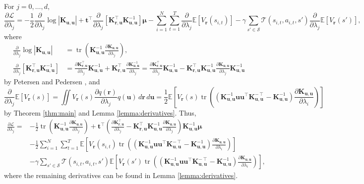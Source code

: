 \documentclass{article}
\theoremstyle{definition}
\theoremstyle{remark}
\DeclareMathOperator{\tr}{tr}
\newcommand{\Kuu}{\mathbf{K}_{\mathbf{u},\mathbf{u}}}
\newcommand{\Kru}{\mathbf{K}_{\mathbf{r},\mathbf{u}}}
\newcommand{\V}{V_{\mathbf{r}}}
\newcommand{\dlj}{\frac{\partial}{\partial \lambda_j}}
\newcommand{\dx}{\,d\mathbf{r}\,d\mathbf{u}}
\begin{document}
For $j = 0, \dots, d$,
\[
  \frac{\partial \mathcal{L}}{\partial \lambda_j} = - \frac{1}{2}\dlj\log|\Kuu|
  + \mathbf{t}^\intercal\dlj \left[ \Kru^\intercal\Kuu^{-1} \right] \bm\mu -
  \sum_{i=1}^N \sum_{t=1}^T \dlj\mathbb{E}[\V(s_{i,t})] -
  \gamma\sum_{s' \in \mathcal{S}} \mathcal{T}(s_{i,t}, a_{i,t},
  s')\dlj\mathbb{E}[\V(s')],
\]
where
\begin{align*}
  \dlj\log|\Kuu| &= \tr \left( \Kuu^{-1} \frac{\partial \Kuu}{\partial \lambda_j}
  \right), \\
  \dlj \left[ \Kru^\intercal\Kuu^{-1} \right] &= \frac{\partial
    \Kru^\intercal}{\partial \lambda_j} \Kuu^{-1} + \Kru^\intercal
  \frac{\partial \Kuu^{-1}}{\partial \lambda_j} = \frac{\partial
    \Kru^\intercal}{\partial \lambda_j} \Kuu^{-1} -
  \Kru^\intercal\Kuu^{-1}\frac{\partial \Kuu}{\partial \lambda_j}\Kuu^{-1}
\end{align*}
by Petersen and Pedersen \cite{petersen2008matrix}, and
\[
  \dlj \mathbb{E}[\V(s)] = \iint\V(s)\frac{\partial q(\mathbf{r})}{\partial
    \lambda_j}q(\mathbf{u})\dx = \frac{1}{2}\mathbb{E} \left[ \V(s) \tr
    \left((\Kuu^{-1}\mathbf{u}\mathbf{u}^\intercal\Kuu^{-\intercal} - \Kuu^{-1})
      \frac{\partial \Kuu}{\partial \lambda_i} \right) \right]
\]
by Theorem \ref{thm:main} and Lemma \ref{lemma:derivatives}. Thus,
\[
  \begin{split}
    \frac{\partial \mathcal{L}}{\partial \lambda_j} = &- \frac{1}{2} \tr
    \left(\Kuu^{-1} \frac{\partial \Kuu}{\partial \lambda_j} \right) +
    \mathbf{t}^\intercal \left( \frac{\partial \Kru^\intercal}{\partial
        \lambda_j} - \Kru^\intercal\Kuu^{-1}\frac{\partial
        \Kuu}{\partial \lambda_j} \right) \Kuu^{-1} \bm\mu \\
    &- \frac{1}{2} \sum_{i=1}^N \sum_{t=1}^T \mathbb{E} \left[ \V(s_{i,t}) \tr
      \left((\Kuu^{-1}\mathbf{u}\mathbf{u}^\intercal\Kuu^{-\intercal} -
        \Kuu^{-1}) \frac{\partial \Kuu}{\partial \lambda_i} \right) \right] \\
    &- \gamma\sum_{s' \in \mathcal{S}} \mathcal{T}(s_{i,t}, a_{i,t}, s')
    \mathbb{E} \left[ \V(s') \tr
      \left((\Kuu^{-1}\mathbf{u}\mathbf{u}^\intercal\Kuu^{-\intercal} -
        \Kuu^{-1}) \frac{\partial \Kuu}{\partial \lambda_i} \right) \right],
  \end{split}
\]
where the remaining derivatives can be found in Lemma \ref{lemma:derivatives}.



\end{document}
